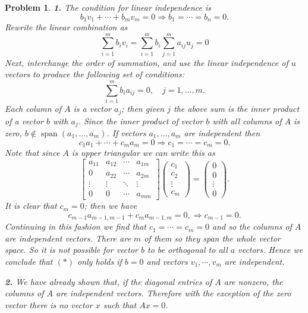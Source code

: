 \documentclass{article}
\theoremstyle{pprop}
\newtheorem{problem}{Problem}[section]
\begin{document}
\begin{problem}
\noindent\textbf{1.} The condition for linear independence is
$$
b_1v_1+\cdots+b_mv_m=0\Rightarrow b_1=\cdots=b_n=0.
$$
Rewrite the linear combination as
$$
\sum_{i=1}^m b_i v_i =\sum_{i=1}^m b_i \sum_{j=1}^m a_{ij} u_j=0
$$   
Next, interchange the order of summation, and use the linear independence of $u$ vectors to produce the following set of conditions:
\begin{equation}
 \sum_{i=1}^m b_i a_{ij}=0, \quad j=1,\ldots,m. \tag{$\ast$}
\end{equation}
Each column of $A$ is a vector $a_{j}$; then given $j$ the above sum is the inner product of a vector $b$ with $a_j$. 
Since the inner product of vector $b$ with all columns of $A$ is zero, $b \notin \operatorname*{span}(a_1,\ldots,a_m)$.
If vectors $a_1,\ldots,a_m$ are independent then 
$$
c_1 a_1 + \cdots + c_m a_m =0 \Rightarrow c_1=\cdots=c_m=0.
$$ 
Note that since $A$ is upper triangular we can write this as 
$$
\begin{bmatrix}
	a_{11} & a_{12} & \cdots & a_{1m} \\
	0 & a_{22} & \cdots & a_{2m} \\
	\vdots & \vdots & \ddots & \vdots \\
	0 & 0 & \cdots & a_{mm} 
\end{bmatrix}
\begin{pmatrix}
c_1 \\ c_2 \\ \vdots \\ c_m
\end{pmatrix}=
\begin{pmatrix}
0 \\ 0 \\ \vdots \\ 0
\end{pmatrix}.
$$
It is clear that $c_m=0$; then we have 
$$
c_{m-1}a_{m-1,m-1}+c_m a_{m-1,m}=0, \Rightarrow c_{m-1}=0.
$$
Continuing in this fashion we find that $c_1 =\cdots=c_m=0$ and so the columns of $A$ are independent vectors. 
There are $m$ of them so they span the whole vector space. So it is not possible for vector $b$ to be orthogonal to 
all $a$ vectors. Hence we conclude that $(\ast)$ only holds if $b=0$ and vectors $v_1,\cdots,v_m$ are independent.
\par\noindent\textbf{2.} We have already shown that, if the diagonal entries of $A$ are nonzero, the columns of $A$ are 
independent vectors. Therefore with the exception of the zero vector there is no vector $x$ such that $Ax=0$. 

\end{problem}
\end{document}
